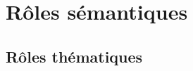 \documentclass[xcolor=table]{beamer}
\begin{document}
\section{Rôles sémantiques}

%	
%	

\subsection{Rôles thématiques}
\end{document}
